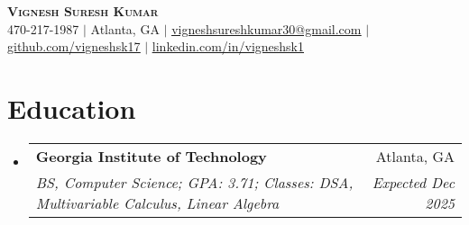 \documentclass[letterpaper,11pt]{article}
\makeatletter
\newcommand{\resumeItem}[1]{
  \item\small{
    {#1 \vspace{-2pt}}
  }
}
\newcommand{\resumeSubheading}[4]{%
\vspace{-1pt}%
  \item
    \begin{tabular*}{0.97\textwidth}{l@{\extracolsep{\fill}}r}
      \textbf{#1} & #2 \\
      \textit{\small#3} & \textit{\small #4} \\

    \end{tabular*}%
  \vspace{-9pt}
}
\newcommand{\resumeSubHeadingListStart}{\begin{itemize}[leftmargin=0.15in, label={}]}
\newcommand{\resumeSubHeadingListEnd}{\end{itemize}}
\newcommand{\resumeItemListStart}{\begin{itemize}}
\newcommand{\resumeItemListEnd}{\end{itemize}\vspace{-5pt}}
\makeatother
\begin{document}

\begin{center}
    \textbf{\Huge \scshape Vignesh Suresh Kumar} \\ \vspace{1pt}
    \small 470-217-1987 $|$ \small Atlanta, GA $|$
    \href{mailto:vigneshsureshkumar30@gmail.com}{\underline{vigneshsureshkumar30@gmail.com}} $|$
    \href{https://github.com/VigneshSK17}{\underline{github.com/vigneshsk17}} $|$
    \href{https://www.linkedin.com/in/vigneshsk1}{\underline{linkedin.com/in/vigneshsk1}}
\end{center}


\section{Education}
  \resumeSubHeadingListStart
    \resumeSubheading
      {Georgia Institute of Technology}{Atlanta, GA}
      {BS, Computer Science; GPA: 3.71; Classes: DSA, Multivariable Calculus, Linear Algebra}{Expected Dec 2025}

  \resumeSubHeadingListEnd



\end{document}
